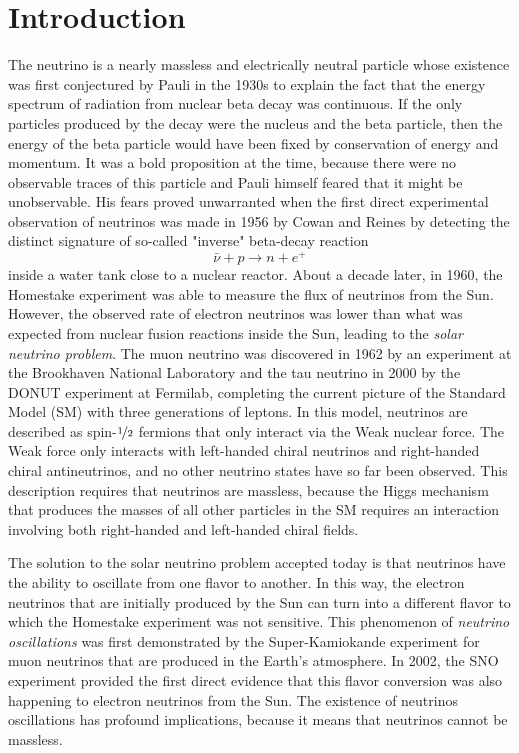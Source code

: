 \setchapterpreamble[u]{\margintoc}
\chapter{Introduction}

The neutrino is a nearly massless and electrically neutral particle whose existence was first conjectured by Pauli in the 1930s to explain the fact that the energy spectrum of radiation from nuclear beta decay was continuous. If the only particles produced by the decay were the nucleus and the beta particle, then the energy of the beta particle would have been fixed by conservation of energy and momentum. It was a bold proposition at the time, because there were no observable traces of this particle and Pauli himself feared that it might be unobservable. His fears proved unwarranted when the first direct experimental observation of neutrinos was made in 1956 by Cowan and Reines\cite{cowan:1956} by detecting the distinct signature of so-called "inverse" beta-decay reaction
\begin{equation}
    \bar{\nu} + p \rightarrow n + e^+
\end{equation}
inside a water tank close to a nuclear reactor. About a decade later, in 1960, the Homestake experiment was able to measure the flux of neutrinos from the Sun. However, the observed rate of electron neutrinos was lower than what was expected from nuclear fusion reactions inside the Sun, leading to the \emph{solar neutrino problem}. The muon neutrino was discovered in 1962 by an experiment at the Brookhaven National Laboratory\cite{PhysRevLett.9.36} and the tau neutrino in 2000 by the DONUT experiment at Fermilab\cite{Kodama_2001}, completing the current picture of the Standard Model (SM) with three generations of leptons. In this model, neutrinos are described as spin-$\nicefrac{1}{2}$ fermions that only interact via the Weak nuclear force. The Weak force only interacts with left-handed chiral neutrinos and right-handed chiral antineutrinos, and no other neutrino states have so far been observed. This description requires that neutrinos are massless, because the Higgs mechanism that produces the masses of all other particles in the SM requires an interaction involving both right-handed and left-handed chiral fields.

The solution to the solar neutrino problem accepted today is that neutrinos have the ability to oscillate from one flavor to another. In this way, the electron neutrinos that are initially produced by the Sun can turn into a different flavor to which the Homestake experiment was not sensitive. This phenomenon of \emph{neutrino oscillations} was first demonstrated by the Super-Kamiokande experiment for muon neutrinos that are produced in the Earth's atmosphere\cite{PhysRevLett.81.1562}. In 2002, the SNO experiment provided the first direct evidence that this flavor conversion was also happening to electron neutrinos from the Sun\cite{PhysRevLett.89.011301}. The existence of neutrinos oscillations has profound implications, because it means that neutrinos cannot be massless.

